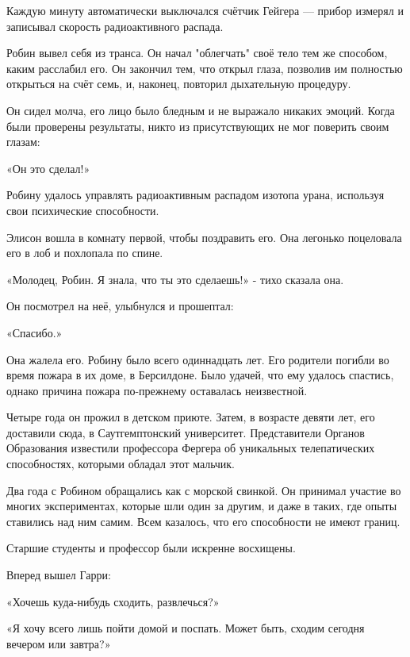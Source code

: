 \documentclass[a4paper,12pt]{book}
\begin{document}
\par
Каждую минуту автоматически выключался счётчик Гейгера — прибор измерял и записывал скорость радиоактивного распада.\\
\par
Робин вывел себя из транса. Он начал "облегчать" своё тело тем же способом, каким расслабил его. Он закончил тем, что открыл глаза, позволив им полностью открыться на счёт семь, и, наконец, повторил дыхательную процедуру.
\par
Он сидел молча, его лицо было бледным и не выражало никаких эмоций. Когда были проверены результаты, никто из присутствующих не мог поверить своим глазам:\\
\par
«Он это сделал!»\\
\par
Робину удалось управлять радиоактивным распадом изотопа урана, используя свои психические способности.
\par
Элисон вошла в комнату первой, чтобы поздравить его. Она легонько поцеловала его в лоб и похлопала по спине.
\par
«Молодец, Робин. Я знала, что ты это сделаешь!» - тихо сказала она.\\
\par
Он посмотрел на неё, улыбнулся и прошептал:
\par
«Спасибо.»
\par
Она жалела его. Робину было всего одиннадцать лет. Его родители погибли во время пожара в их доме, в Берсилдоне. Было удачей, что ему удалось спастись, однако причина пожара по-прежнему оставалась неизвестной.
\par
Четыре года он прожил в детском приюте. Затем, в возрасте девяти лет, его доставили сюда, в Саутгемптонский университет. Представители Органов Образования известили профессора Фергера об уникальных телепатических способностях, которыми обладал этот мальчик.
\par
Два года с Робином обращались как с морской свинкой. Он принимал участие во многих экспериментах, которые шли один за другим, и даже в таких, где опыты ставились над ним самим. Всем казалось, что его способности не имеют границ.\\
\par
Старшие студенты и профессор были искренне восхищены.
\par
Вперед вышел Гарри:
\par
«Хочешь куда-нибудь сходить, развлечься?»
\par
«Я хочу всего лишь пойти домой и поспать. Может быть, сходим сегодня вечером или завтра?»
\end{document}
